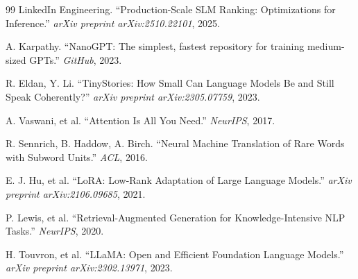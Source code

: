 \documentclass[11pt]{article}
\begin{document}
\begin{thebibliography}{99}
 LinkedIn Engineering. ``Production-Scale SLM
Ranking: Optimizations for Inference.'' \emph{arXiv preprint
arXiv:2510.22101}, 2025.

 A. Karpathy. ``NanoGPT: The simplest,
fastest repository for training medium-sized GPTs.'' \emph{GitHub}, 2023.

 R. Eldan, Y. Li. ``TinyStories: How Small
Can Language Models Be and Still Speak Coherently?'' \emph{arXiv preprint
arXiv:2305.07759}, 2023.

 A. Vaswani, et al. ``Attention Is All You
Need.'' \emph{NeurIPS}, 2017.

 R. Sennrich, B. Haddow, A. Birch. ``Neural
Machine Translation of Rare Words with Subword Units.'' \emph{ACL}, 2016.

 E. J. Hu, et al. ``LoRA: Low-Rank Adaptation of Large
Language Models.'' \emph{arXiv preprint arXiv:2106.09685}, 2021.

 P. Lewis, et al. ``Retrieval-Augmented Generation
for Knowledge-Intensive NLP Tasks.'' \emph{NeurIPS}, 2020.

 H. Touvron, et al. ``LLaMA: Open and Efficient
Foundation Language Models.'' \emph{arXiv preprint arXiv:2302.13971}, 2023.

\end{thebibliography}
\end{document}
